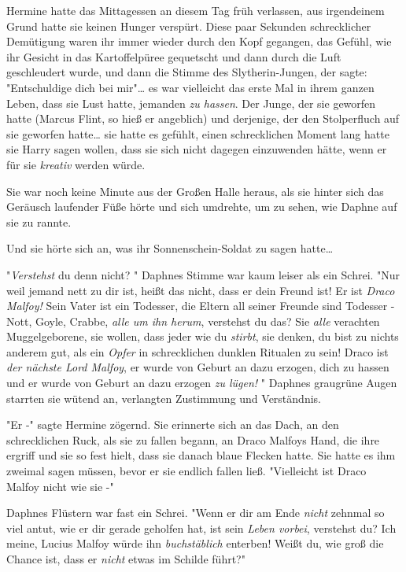 {Hermine hatte das Mittagessen an diesem Tag früh verlassen, aus irgendeinem Grund hatte sie keinen Hunger verspürt. Diese paar Sekunden schrecklicher Demütigung waren ihr immer wieder durch den Kopf gegangen, das Gefühl, wie ihr Gesicht in das Kartoffelpüree gequetscht und dann durch die Luft geschleudert wurde, und dann die Stimme des Slytherin-Jungen, der sagte: "Entschuldige dich bei mir"… es war vielleicht das erste Mal in ihrem ganzen Leben, dass sie Lust hatte, jemanden \emph{zu hassen}. Der Junge, der sie geworfen hatte (Marcus Flint, so hieß er angeblich) und derjenige, der den Stolperfluch auf sie geworfen hatte… sie hatte es gefühlt, einen schrecklichen Moment lang hatte sie Harry sagen wollen, dass sie sich nicht dagegen einzuwenden hätte, wenn er für sie \emph{kreativ} werden würde.

Sie war noch keine Minute aus der Großen Halle heraus, als sie hinter sich das Geräusch laufender Füße hörte und sich umdrehte, um zu sehen, wie Daphne auf sie zu rannte.

Und sie hörte sich an, was ihr Sonnenschein-Soldat zu sagen hatte…

"\emph{Verstehst} du denn nicht? " Daphnes Stimme war kaum leiser als ein Schrei. "Nur weil jemand nett zu dir ist, heißt das nicht, dass er dein Freund ist! Er ist \emph{Draco Malfoy!} Sein Vater ist ein Todesser, die Eltern all seiner Freunde sind Todesser - Nott, Goyle, Crabbe, \emph{alle um ihn herum}, verstehst du das? Sie \emph{alle} verachten Muggelgeborene, sie wollen, dass jeder wie du \emph{stirbt}, sie denken, du bist zu nichts anderem gut, als ein \emph{Opfer} in schrecklichen dunklen Ritualen zu sein! Draco ist \emph{der nächste Lord Malfoy}, er wurde von Geburt an dazu erzogen, dich zu hassen und er wurde von Geburt an dazu erzogen \emph{zu lügen!} " Daphnes graugrüne Augen starrten sie wütend an, verlangten Zustimmung und Verständnis.

"Er -" sagte Hermine zögernd. Sie erinnerte sich an das Dach, an den schrecklichen Ruck, als sie zu fallen begann, an Draco Malfoys Hand, die ihre ergriff und sie so fest hielt, dass sie danach blaue Flecken hatte. Sie hatte es ihm zweimal sagen müssen, bevor er sie endlich fallen ließ. "Vielleicht ist Draco Malfoy nicht wie sie -"

Daphnes Flüstern war fast ein Schrei. "Wenn er dir am Ende \emph{nicht} zehnmal so viel antut, wie er dir gerade geholfen hat, ist sein \emph{Leben vorbei}, verstehst du? Ich meine, Lucius Malfoy würde ihn \emph{buchstäblich} enterben! Weißt du, wie groß die Chance ist, dass er \emph{nicht} etwas im Schilde führt?"

}
